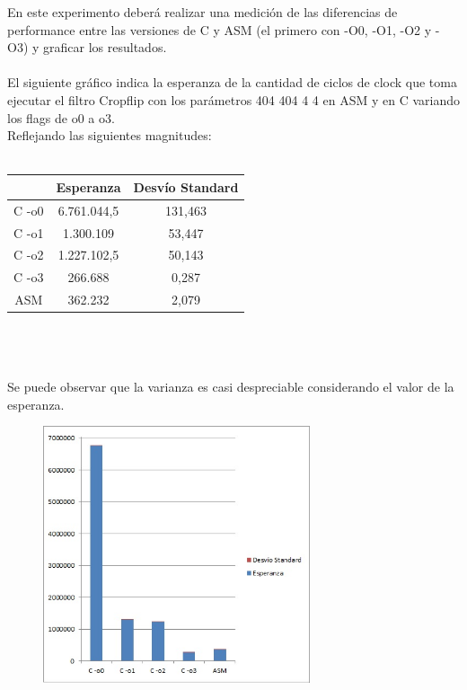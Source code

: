 En este experimento deberá realizar una medición de las diferencias de 
performance entre las versiones de C y ASM (el primero con -O0, -O1, -O2 y -O3) 
y graficar los resultados. \\
\\
El siguiente gr\'afico indica la esperanza de la cantidad de ciclos de clock que toma ejecutar el filtro Cropflip con los par\'ametros 404 404 4 4 en ASM y en C variando los flags de o0 a o3. \\
Reflejando las siguientes magnitudes: \\
\\
 \begin{tabular}[c]{|c|c|c|}
	\hline
		 & Esperanza & Desv\'io Standard\\
		\hline
C -o0 & 6.761.044,5 & 131,463 \\
\hline
C -o1 & 1.300.109 & 53,447 \\
\hline
C -o2 & 1.227.102,5 & 50,143\\
\hline
C -o3 & 266.688 & 0,287 \\
\hline
ASM & 362.232 & 2,079\\
\hline
	\end{tabular}\\\\
\\
Se puede observar que la varianza es casi despreciable considerando el valor de la esperanza. \\
\newpage
\begin{figure}
  \begin{center}
	\includegraphics[width=0.7\textwidth]{imagenes/14.jpg}
  \end{center}
\end{figure}
\newpage

